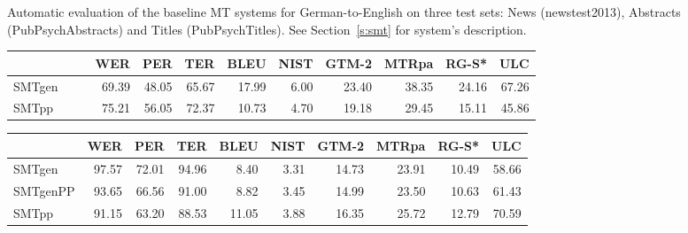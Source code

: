 \documentclass[a4paper,11pt]{article}
\begin{document}
\begin{table}[t]
 \caption{Automatic evaluation of the baseline MT systems for German-to-English on three test sets: News (newstest2013), Abstracts (PubPsychAbstracts) and Titles (PubPsychTitles). See Section~\ref{s:smt} for system's description.}
 \label{tab:DeEn}
\end{table}



\begin{table}[t]
\small

\begin{tabular}{lrrrrrrrrr}
\toprule
         & WER   &  PER  & TER   &  BLEU & NIST & GTM-2 & MTRpa & RG-S* & ULC \\
\midrule
SMTgen~~~~ & 69.39 & 48.05 & 65.67 & 17.99 & 6.00 & 23.40 & 38.35 & 24.16 & 67.26 \\  
SMTpp	 & 75.21 & 56.05 & 72.37 & 10.73 & 4.70 & 19.18 & 29.45 & 15.11 & 45.86 \\  
\bottomrule
\end{tabular}

\begin{tabular}{lrrrrrrrrr}
\toprule
         & WER   &  PER  & TER   &  BLEU & NIST & GTM-2 & MTRpa & RG-S* & ULC \\
\midrule
SMTgen	 &  97.57 & 72.01 &  94.96 & 8.40 & 3.31 & 14.73 & 23.91 & 10.49 & 58.66 \\  
SMTgenPP &  93.65 & 66.56 &  91.00 & 8.82 & 3.45 & 14.99 & 23.50 & 10.63 & 61.43 \\  
SMTpp	 &  91.15 & 63.20 &  88.53 &11.05 & 3.88 & 16.35 & 25.72 & 12.79 & 70.59 \\  
\bottomrule
\end{tabular}



\end{table}
\end{document}
